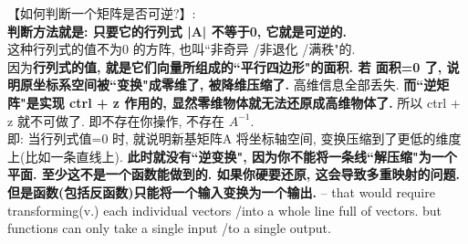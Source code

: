 \documentclass[UTF8]{ctexart}
\begin{document}
【如何判断一个矩阵是否可逆?】: \\
\textbf{判断方法就是: 只要它的行列式 |A| 不等于0, 它就是可逆的.}\\
这种行列式的值不为0 的方阵, 也叫``非奇异 /非退化 /满秩"的.\\

因为\textbf{行列式的值, 就是它们向量所组成的``平行四边形"的面积. 若 面积=0 了, 说明原坐标系空间被``变换"成零维了, 被降维压缩了.} 高维信息全部丢失. \textbf{而``逆矩阵"是实现 ctrl + z 作用的, 显然零维物体就无法还原成高维物体了.} 所以 ctrl + z 就不可做了. 即不存在你操作, 不存在 $ A^{-1}$.\\

即: 当行列式值=0 时, 就说明新基矩阵A 将坐标轴空间, 变换压缩到了更低的维度上(比如一条直线上). \textbf{此时就没有``逆变换", 因为你不能将一条线``解压缩"为一个平面. 至少这不是一个函数能做到的. 如果你硬要还原, 这会导致多重映射的问题. 但是函数(包括反函数)只能将一个输入变换为一个输出.} -- that would require transforming(v.) each individual vectors /into a whole line full of vectors. but functions can only take a single input /to a single output. \\
\end{document}
